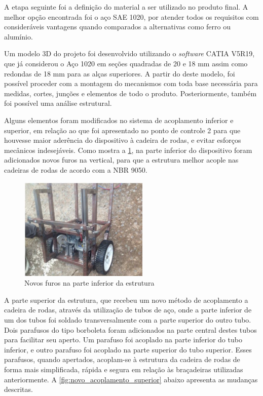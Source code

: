 A etapa seguinte foi a definição do material a ser utilizado no produto final. A melhor opção encontrada foi o aço SAE 1020, por atender todos os requisitos com consideráveis vantagens quando comparados a alternativas como ferro ou alumínio.

Um modelo 3D do projeto foi desenvolvido utilizando o \textit{software} CATIA V5R19, que já considerou o Aço 1020 em seções quadradas de 20 e 18 mm assim como redondas de 18 mm para as alças superiores. A partir do deste modelo, foi possível proceder com a montagem do mecanismos com toda base necessária para medidas, cortes, junções e elementos de todo o produto. Posteriormente, também foi possível uma análise estrutural.

Alguns elementos foram modificados no sistema de acoplamento inferior e superior, em relação ao que foi apresentado no ponto de controle 2 para que houvesse maior aderência do dispositivo à cadeira de rodas, e evitar esforços mecânicos indesejáveis. Como mostra a \ref{fig:furos_estrutura}, na parte inferior do dispositivo foram adicionados novos furos na vertical, para que a estrutura melhor acople nas cadeiras de rodas de acordo com a NBR 9050.

\begin{figure}[!htb]
\centering
\includegraphics[width=0.55\textwidth]{figuras/resultados/furos_estrutura}
\caption{Novos furos na parte inferior da estrutura}
\label{fig:furos_estrutura}
\end{figure}

A parte superior da estrutura, que recebeu um novo método de acoplamento a cadeira de rodas, através da utilização de tubos de aço, onde a parte inferior de um dos tubos foi soldado transversalmente com a parte superior do outro tubo. Dois parafusos do tipo borboleta foram adicionados na parte central destes tubos para facilitar seu aperto. Um parafuso foi acoplado na parte inferior do tubo inferior, e outro parafuso foi acoplado na parte superior do tubo superior. Esses parafusos, quando apertados, acoplam-se à estrutura da cadeira de rodas de forma mais simplificada, rápida e segura em relação às braçadeiras utilizadas anteriormente. A \ref{fig:novo_acoplamento_superior} abaixo apresenta as mudanças descritas.

